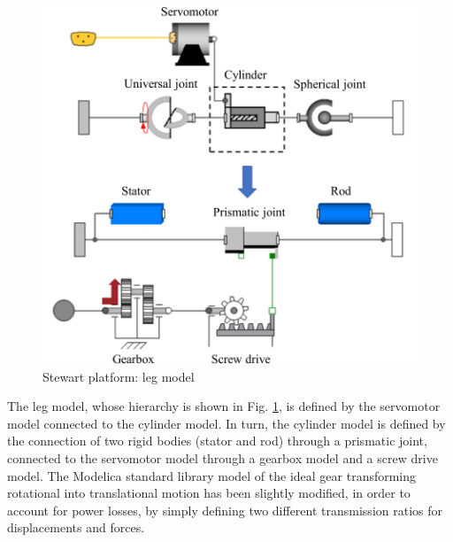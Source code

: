 \documentclass[]{interact}
\theoremstyle{plain}%
\theoremstyle{definition}
\theoremstyle{remark}
\begin{document}
\begin{figure}
\centering
\includegraphics[width=0.65\columnwidth]{./images/Stewart_platform_Modelica_leg.pdf}
\caption{Stewart platform: leg model} \label{Fig:Stewart_platform_Modelica_leg}
\end{figure}
The leg model, whose hierarchy is shown in Fig. \ref{Fig:Stewart_platform_Modelica_leg}, is defined by the servomotor model connected to the cylinder model. In turn, the cylinder model is defined by the connection of two rigid bodies (stator and rod) through a prismatic joint, connected to the servomotor model through a gearbox model and a screw drive model. The Modelica standard library model of the ideal gear transforming rotational into translational motion has been slightly modified, in order to account for power losses, by simply defining two different transmission ratios for displacements and forces.
\end{document}
